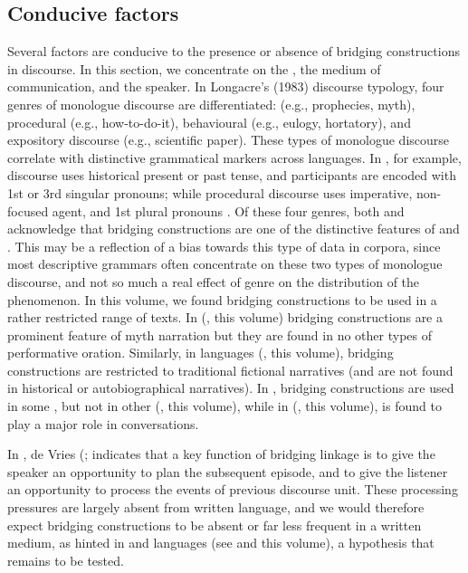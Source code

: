 \documentclass[output=paper]{LSP/langsci}
\begin{document}
\subsection{Conducive factors} 
\label{GuAi41conducive}
Several factors are conducive to the presence or absence of bridging constructions in discourse. In this section, we concentrate on the , the medium of communication, and the speaker. 
In Longacre’s (1983) discourse typology, four genres of monologue discourse are differentiated:  (e.g., prophecies, myth), procedural (e.g., how-to-do-it), behavioural (e.g., eulogy, hortatory), and expository discourse (e.g., scientific paper). These types of monologue discourse correlate with distinctive grammatical markers across languages. In , for example,  discourse uses historical present or past tense, and participants are encoded with 1st or 3rd singular pronouns; while procedural discourse uses imperative, non-focused agent, and 1st plural pronouns \citep[][3--17]{longacre83}. Of these four genres, both \citet[][9]{longacre83} and \citet[][365]{devries.2005} acknowledge that bridging constructions are one of the distinctive features of  and . This may be a reflection of a bias towards this type of data in corpora, since most descriptive grammars often concentrate on these two types of monologue discourse, and not so much a real effect of genre on the distribution of the phenomenon. In this volume, we found bridging constructions to be used in a rather restricted range of texts. In  (\citeauthor{emlen18}, this volume) bridging constructions are a prominent feature of myth narration but they are found in no other types of performative oration. Similarly, in  languages (\citeauthor{anker18}, this volume), bridging constructions are restricted to traditional fictional narratives (and are not found in historical or autobiographical narratives). In , bridging constructions are used in some , but not in other  (\citeauthor{sarvasy18}, this volume), while in  (\citeauthor{alvanoudi18}, this volume),  is found to play a major  role in conversations. 

In , de Vries (\citeyear[][378]{devries.2005};\citeyear[][817]{devries.2006} indicates that a key function of bridging linkage is to give the speaker an opportunity to plan the subsequent  episode, and to give the listener an opportunity to process the events of previous discourse unit.  These processing pressures are largely absent from written language, and we would therefore expect bridging constructions to be absent or far less frequent in a written medium, as hinted in  and  languages (see \citeauthor{emlen18} and \citeauthor{anker18} this volume), a hypothesis that remains to be tested.
\end{document}
